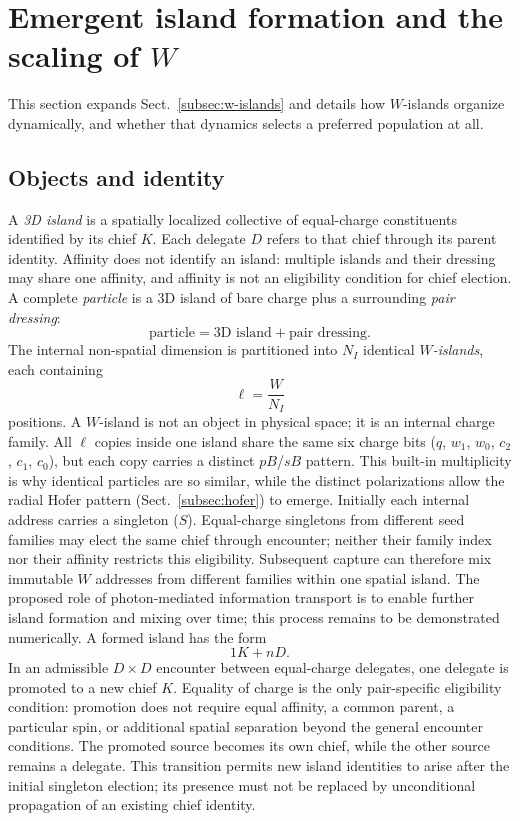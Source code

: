 \documentclass{ijuc}
\begin{document}
\section{Emergent island formation and the scaling of $W$}\label{sec:dynamic-charge-quantization}
This section expands Sect.~\ref{subsec:w-islands} and details how $W$-islands organize dynamically, and whether that dynamics selects a preferred population at all.
\subsection{Objects and identity}
A \emph{3D island} is a spatially localized collective of equal-charge constituents identified by its chief $K$. Each delegate $D$ refers to that chief through its parent identity. Affinity does not identify an island: multiple islands and their dressing may share one affinity, and affinity is not an eligibility condition for chief election. A complete \emph{particle} is a 3D island of bare charge plus a surrounding \emph{pair dressing}:
\begin{equation}
\text{particle} = \text{3D island} + \text{pair dressing}.
\end{equation}
The internal non-spatial dimension is partitioned into $N_I$ identical \emph{$W$-islands}, each containing
\begin{equation}
\ell = \frac{W}{N_I}
\end{equation}
positions. A $W$-island is not an object in physical space; it is an internal charge family. All $\ell$ copies inside one island share the same six charge bits ($q$, $w_1$, $w_0$, $c_2$, $c_1$, $c_0$), but each copy carries a distinct $pB$/$sB$ pattern. This built-in multiplicity is why identical particles are so similar, while the distinct polarizations allow the radial Hofer pattern (Sect.~\ref{subsec:hofer}) to emerge.
Initially each internal address carries a singleton ($S$). Equal-charge singletons from different seed families may elect the same chief through encounter; neither their family index nor their affinity restricts this eligibility. Subsequent capture can therefore mix immutable $W$ addresses from different families within one spatial island. The proposed role of photon-mediated information transport is to enable further island formation and mixing over time; this process remains to be demonstrated numerically. A formed island has the form
\begin{equation}
1K + nD.
\end{equation}
In an admissible $D\times D$ encounter between equal-charge delegates, one delegate is promoted to a new chief $K$. Equality of charge is the only pair-specific eligibility condition: promotion does not require equal affinity, a common parent, a particular spin, or additional spatial separation beyond the general encounter conditions. The promoted source becomes its own chief, while the other source remains a delegate. This transition permits new island identities to arise after the initial singleton election; its presence must not be replaced by unconditional propagation of an existing chief identity.
\end{document}
